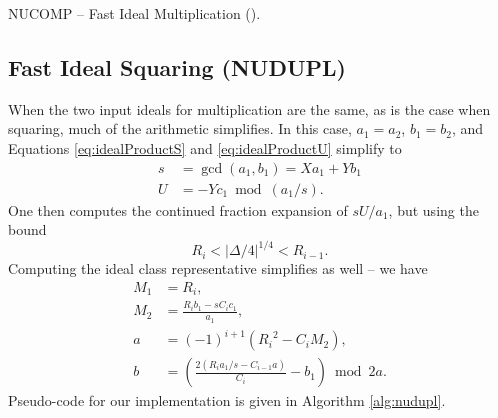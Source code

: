 \documentclass{ucalgthes1}
\theoremstyle{definition}
\newcommand{\algnewline}{\par\noindent\hskip\algorithmicindent}
\newcommand{\ZZ}{\mathbb{Z}}
\newcommand{\matrixtt}[4]{\left[ \begin{array}{rr} #1 & #2 \\ #3 & #4 \end{array} \right]}
\newcommand{\floor}[1]{\left\lfloor #1 \right\rfloor}
\begin{document}
\begin{algorithm}[htb]
\caption{NUCOMP -- Fast Ideal Multiplication (\cite[pp.441-443]{Jacobson2009}).}
\label{alg:nucomp}
\end{algorithm}


\subsection{Fast Ideal Squaring (NUDUPL)}
\label{subsec:nudupl}

When the two input ideals for multiplication are the same, as is the case when squaring, much of the arithmetic simplifies.  In this case, $a_1 = a_2$, $b_1 = b_2$, and Equations \ref{eq:idealProductS} and \ref{eq:idealProductU} simplify to
\begin{align*}
	s &= \gcd(a_1, b_1) = Xa_1 + Yb_1 \\
	U &= -Yc_1 \bmod (a_1/s).
\end{align*}
One then computes the continued fraction expansion of $sU/a_1$, but using the bound
\[
	R_i < |\Delta/4|^{1/4} < R_{i-1}.
\]
Computing the ideal class representative simplifies as well -- we have
\begin{align*}
	M_1 &= R_i, \\
	M_2 &= \frac{R_i b_1 - sC_i c_1}{a_1}, \\
	a &= (-1)^{i+1}({R_i}^2 - C_i M_2), \\
	b &= \left(\frac{2(R_i a_1/s  - C_{i-1} a)}{C_i} - b_1 \right) \bmod{2a}.
\end{align*}
Pseudo-code for our implementation is given in Algorithm \ref{alg:nudupl}.
\end{document}
